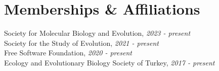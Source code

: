 \documentclass[letterpaper,10.5pt]{article}
\begin{document}
\section{Memberships \& Affiliations}
Society for Molecular Biology and Evolution, \textit{2023 - present} \\
Society for the Study of Evolution, \textit{2021 - present} \\
Free Software Foundation, \textit{2020 - present} \\
Ecology and Evolutionary Biology Society of Turkey, \textit{2017 - present} \\
\end{document}
